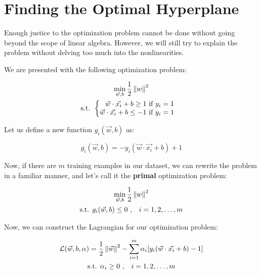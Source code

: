 \section{Finding the Optimal Hyperplane}
\label{appendix:optimzation}

Enough justice to the optimization problem cannot be done without going beyond the scope of linear algebra. However, we will still try to explain the problem without delving too much into the nonlinearities.

We are presented with the following optimization problem:

\begin{gather}
	\min_{\vec{w}, b} \frac{1}{2}\left\lVert w\right\rVert^2 \nonumber\\
	\text{s.t. }
	\begin{cases}
	\begin{aligned}
		\vec{w}\cdot\vec{x_i} + b \geq 1 \text{ if $y_i = 1$} \nonumber\\
		\vec{w}\cdot\vec{x_i} + b \leq -1 \text{ if $y_i = 1$} \nonumber
	\end{aligned}
	\end{cases}
\end{gather}

Let us define a new function $g_i(\vec{w}, b)$ as:

\begin{equation}
	g_i(\vec{w}, b) = -y_i(\vec{w}\cdot\vec{x_i} + b) + 1
\end{equation}

Now, if there are $m$ training examples in our dataset, we can rewrite the problem in a familiar manner, and let's call it the \textbf{primal} optimization problem:

\begin{gather}
	\min_{\vec{w}, b} \frac{1}{2}\left\lVert w\right\rVert^2 \nonumber\\
	\text{s.t. }
	g_i(\vec{w}, b)  \leq 0 \text{ ,}\quad\text{$i = 1, 2, \dots , m$}\nonumber
\end{gather}

Now, we can construct the Lagrangian for our optimization problem:

\begin{gather}
\mathcal{L}(\vec{w}, b, \alpha) = \frac{1}{2}\left\lVert\vec{w}\right\rVert^2 - \sum_{i = 1}^{m}\alpha_i[y_i(\vec{w}\cdot\vec{x_i} + b) - 1] \label{eq:lag} \\
\text{s.t. } \alpha_{i} \geq 0\text{ ,}\quad\text{$i = 1, 2, \dots , m$}\nonumber
\end{gather}

